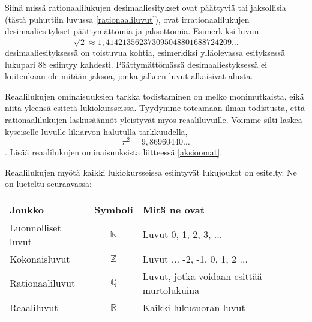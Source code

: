Siinä missä rationaalilukujen desimaaliesitykset ovat päättyviä tai jaksollisia (tästä puhuttiin luvussa \ref{rationaaliluvut}), ovat
irrationaalilukujen desimaaliesitykset päättymättömiä ja
jaksottomia. Esimerkiksi luvun
\[\sqrt{2} \approx 1,414213562373095048801688724209\ldots\]
desimaaliesityksessä on toistuvua kohtia, esimerkiksi ylläolevassa esityksessä lukupari 88 esiintyy kahdesti. Päättymättömässä desimaaliestyksessä ei kuitenkaan ole mitään jaksoa, jonka jälkeen luvut alkaisivat alusta.

Reaalilukujen ominaisuuksien tarkka todistaminen on melko monimutkaista, eikä niitä yleensä esitetä lukiokursseissa. Tyydymme toteamaan ilman todistusta, että rationaalilukujen
laskusäännöt yleistyvät myös reaaliluvuille. Voimme silti laskea kyseiselle luvulle likiarvon
halutulla tarkkuudella,
\[ \pi^2 =9,86960440\ldots \].
Lisää reaalilukujen ominaisuuksista liitteessä \ref{aksioomat}.

Reaalilukujen myötä kaikki lukiokursseissa esiintyvät lukujoukot on esitelty.
Ne on lueteltu seuraavassa:
\begin{center}\begin{tabular}{l|c|l}
Joukko & Symboli & Mitä ne ovat\\
\hline
Luonnolliset luvut & $\mathbb{N}$ &
Luvut 0, 1, 2, 3, $\ldots$ \\
Kokonaisluvut & $\mathbb{Z}$ & Luvut $\ldots$ -2, -1, 0, 1, 2 $\ldots$ \\
Rationaaliluvut & $\mathbb{Q}$ & Luvut, jotka voidaan esittää
murtolukuina \\
Reaaliluvut & $\mathbb{R}$ & Kaikki lukusuoran luvut
\end{tabular} \end{center} 

